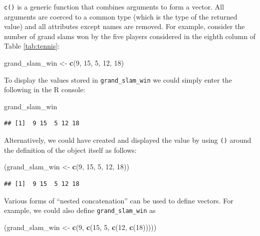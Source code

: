 \documentclass[12pt,]{krantz}
\newenvironment{Shaded}{\begin{snugshade}}{\end{snugshade}}
\newcommand{\KeywordTok}[1]{\textcolor[rgb]{0.27,0.27,0.27}{\textbf{#1}}}
\newcommand{\DecValTok}[1]{\textcolor[rgb]{0.06,0.06,0.06}{#1}}
\newcommand{\StringTok}[1]{\textcolor[rgb]{0.5,0.5,0.5}{#1}}
\newcommand{\NormalTok}[1]{#1}
\begin{document}
\texttt{c()} is a generic function that combines arguments to form a
vector. All arguments are coerced to a common type (which is the type of
the returned value) and all attributes except names are removed. For
example, consider the number of grand slams won by the five players
considered in the eighth column of Table \ref{tab:tennis}:

\begin{Shaded}
\begin{Highlighting}[]
\NormalTok{grand_slam_win <-}\StringTok{ }\KeywordTok{c}\NormalTok{(}\DecValTok{9}\NormalTok{, }\DecValTok{15}\NormalTok{, }\DecValTok{5}\NormalTok{, }\DecValTok{12}\NormalTok{, }\DecValTok{18}\NormalTok{)}
\end{Highlighting}
\end{Shaded}

To display the values stored in \texttt{grand\_slam\_win} we could
simply enter the following in the R console:

\begin{Shaded}
\begin{Highlighting}[]
\NormalTok{grand_slam_win}
\end{Highlighting}
\end{Shaded}

\begin{verbatim}
## [1]  9 15  5 12 18
\end{verbatim}

Alternatively, we could have created and displayed the value by using
\texttt{()} around the definition of the object itself as follows:

\begin{Shaded}
\begin{Highlighting}[]
\NormalTok{(grand_slam_win <-}\StringTok{ }\KeywordTok{c}\NormalTok{(}\DecValTok{9}\NormalTok{, }\DecValTok{15}\NormalTok{, }\DecValTok{5}\NormalTok{, }\DecValTok{12}\NormalTok{, }\DecValTok{18}\NormalTok{))}
\end{Highlighting}
\end{Shaded}

\begin{verbatim}
## [1]  9 15  5 12 18
\end{verbatim}

Various forms of ``nested concatenation'' can be used to define vectors.
For example, we could also define \texttt{grand\_slam\_win} as

\begin{Shaded}
\begin{Highlighting}[]
\NormalTok{(grand_slam_win <-}\StringTok{ }\KeywordTok{c}\NormalTok{(}\DecValTok{9}\NormalTok{, }\KeywordTok{c}\NormalTok{(}\DecValTok{15}\NormalTok{, }\DecValTok{5}\NormalTok{, }\KeywordTok{c}\NormalTok{(}\DecValTok{12}\NormalTok{, }\KeywordTok{c}\NormalTok{(}\DecValTok{18}\NormalTok{)))))}
\end{Highlighting}
\end{Shaded}
\end{document}
